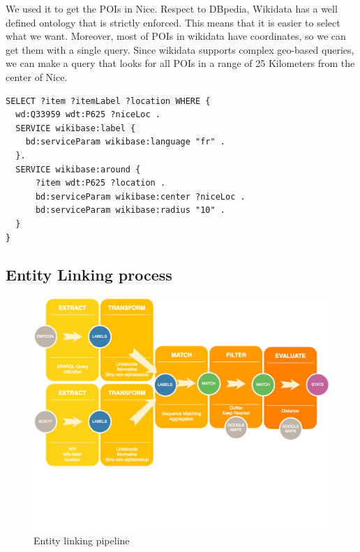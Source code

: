 \documentclass[paper=a4, fontsize=11pt]{scrartcl}
\begin{document}
We used it to get the POIs in Nice. Respect to DBpedia, Wikidata has a well defined ontology that is strictly enforced. This means that it is easier to select what we want. Moreover, most of POIs in wikidata have coordinates, so we can get them with a single query. Since wikidata supports complex geo-based queries, we can make a query that looks for all POIs in a range of 25 Kilometers from the center of Nice.
\begin{lstlisting}
SELECT ?item ?itemLabel ?location WHERE {
  wd:Q33959 wdt:P625 ?niceLoc .
  SERVICE wikibase:label {
    bd:serviceParam wikibase:language "fr" .
  }.
  SERVICE wikibase:around { 
      ?item wdt:P625 ?location . 
      bd:serviceParam wikibase:center ?niceLoc . 
      bd:serviceParam wikibase:radius "10" . 
  }  
}
\end{lstlisting}

\subsection{Entity Linking process}

\begin{figure}[!htb]
  \centering 
    \includegraphics[width=1\textwidth]{images/pipeline.png}
    \caption{Entity linking pipeline}
    \label{fig:pipeline}
\end{figure}
\end{document}
